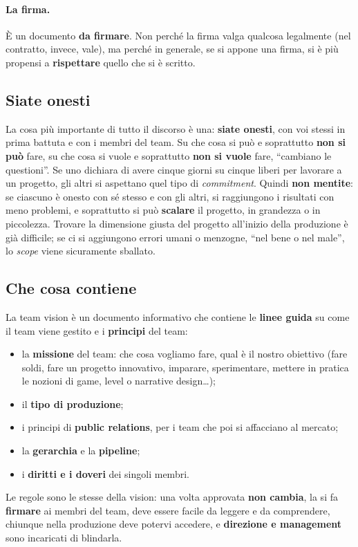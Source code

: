 \paragraph{La firma.} È un documento \textbf{da firmare}. Non perché la firma
valga qualcosa legalmente (nel contratto, invece, vale), ma perché in
generale, se si appone una firma, si è più propensi a \textbf{rispettare}
quello che si è scritto.

\subsection{Siate onesti}

La cosa più importante di tutto il discorso è una: \textbf{siate onesti}, con
voi stessi in prima battuta e con i membri del team. Su che cosa si può e
soprattutto \textbf{non si può} fare, su che cosa si vuole e soprattutto
\textbf{non si vuole} fare, ``cambiano le questioni''. Se uno dichiara di
avere cinque giorni su cinque liberi per lavorare a un progetto, gli altri si
aspettano quel tipo di \emph{commitment}. Quindi \textbf{non mentite}: se
ciascuno è onesto con sé stesso e con gli altri, si raggiungono i risultati
con meno problemi, e soprattutto si può \textbf{scalare} il progetto, in
grandezza o in piccolezza. Trovare la dimensione giusta del progetto
all'inizio della produzione è già difficile; se ci si aggiungono errori
umani o menzogne, ``nel bene o nel male'', lo \emph{scope} viene sicuramente
sballato.

\subsection{Che cosa contiene}

La team vision è un documento informativo che contiene le \textbf{linee
guida} su come il team viene gestito e i \textbf{principi} del team:
\begin{itemize}
  \item la \textbf{missione} del team: che cosa vogliamo fare, qual è il
        nostro obiettivo (fare soldi, fare un progetto innovativo, imparare,
        sperimentare, mettere in pratica le nozioni di game, level o
        narrative design\ldots);
  \item il \textbf{tipo di produzione};
  \item i principi di \textbf{public relations}, per i team che poi si
        affacciano al mercato;
  \item la \textbf{gerarchia} e la \textbf{pipeline};
  \item i \textbf{diritti e i doveri} dei singoli membri.
\end{itemize}
Le regole sono le stesse della vision: una volta approvata \textbf{non
cambia}, la si fa \textbf{firmare} ai membri del team, deve essere facile da
leggere e da comprendere, chiunque nella produzione deve potervi accedere, e
\textbf{direzione e management} sono incaricati di blindarla.

